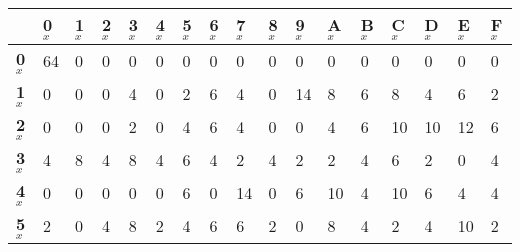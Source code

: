 \begin{longtable}[c]{|l|l|l|l|l|l|l|l|l|l|l|l|l|l|l|l|l|}
\hline
                & \textbf{0$_x$} & \textbf{1$_x$} & \textbf{2$_x$} & \textbf{3$_x$} & \textbf{4$_x$} & \textbf{5$_x$} & \textbf{6$_x$} & \textbf{7$_x$} & \textbf{8$_x$} & \textbf{9$_x$} & \textbf{A$_x$} & \textbf{B$_x$} & \textbf{C$_x$} & \textbf{D$_x$} & \textbf{E$_x$} & \textbf{F$_x$} \\ \hline
\endfirsthead
%
\endhead
%
\textbf{0$_x$}  & 64             & 0              & 0              & 0              & 0              & 0              & 0              & 0              & 0              & 0              & 0              & 0              & 0              & 0              & 0              & 0              \\ \hline
\textbf{1$_x$}  & 0              & 0              & 0              & 4              & 0              & 2              & 6              & 4              & 0              & 14             & 8              & 6              & 8              & 4              & 6              & 2              \\ \hline
\textbf{2$_x$}  & 0              & 0              & 0              & 2              & 0              & 4              & 6              & 4              & 0              & 0              & 4              & 6              & 10             & 10             & 12             & 6              \\ \hline
\textbf{3$_x$}  & 4              & 8              & 4              & 8              & 4              & 6              & 4              & 2              & 4              & 2              & 2              & 4              & 6              & 2              & 0              & 4              \\ \hline
\textbf{4$_x$}  & 0              & 0              & 0              & 0              & 0              & 6              & 0              & 14             & 0              & 6              & 10             & 4              & 10             & 6              & 4              & 4              \\ \hline
\textbf{5$_x$}  & 2              & 0              & 4              & 8              & 2              & 4              & 6              & 6              & 2              & 0              & 8              & 4              & 2              & 4              & 10             & 2              \\ \hline

\end{longtable}
